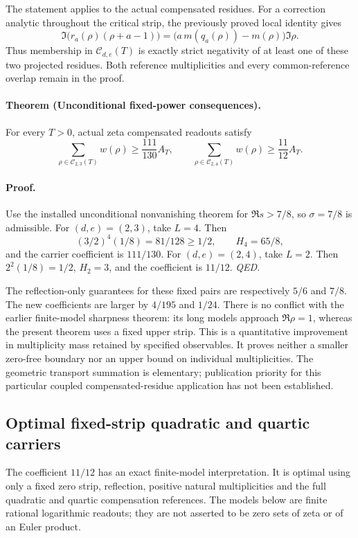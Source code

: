 The statement applies to the actual compensated residues. For a
correction analytic throughout the critical strip, the previously proved
local identity gives
\[
 \Im\!\bigl(r_a(\rho)(\rho+a-1)\bigr)
   =\bigl(a\,m(q_a(\rho))-m(\rho)\bigr)\Im\rho.
\]
Thus membership in \(\mathcal C_{d,e}(T)\) is exactly strict negativity
of at least one of these two projected residues. Both reference
multiplicities and every common-reference overlap remain in the proof.

\paragraph{Theorem (Unconditional fixed-power consequences).}
\label{thm:strip-carrier-seven-eighths}
For every \(T>0\), actual zeta compensated readouts satisfy
\[
 \sum_{\rho\in\mathcal C_{2,3}(T)}w(\rho)\ge\frac{111}{130}A_T,
 \qquad
 \sum_{\rho\in\mathcal C_{2,4}(T)}w(\rho)\ge\frac{11}{12}A_T.
\]
\paragraph{Proof.}
Use the installed unconditional nonvanishing theorem for
\(\Re s>7/8\), so \(\sigma=7/8\) is admissible.
For \((d,e)=(2,3)\), take \(L=4\). Then
\[
 (3/2)^4(1/8)=81/128\ge1/2,\qquad H_4=65/8,
\]
and the carrier coefficient is \(111/130\).
For \((d,e)=(2,4)\), take \(L=2\). Then
\(2^2(1/8)=1/2\), \(H_2=3\), and the coefficient is \(11/12\).
\hfill\textit{QED.}

The reflection-only guarantees for these fixed pairs are respectively
\(5/6\) and \(7/8\). The new coefficients are larger by \(4/195\)
and \(1/24\). There is no conflict with the earlier finite-model
sharpness theorem: its long models approach \(\Re\rho=1\), whereas
the present theorem uses a fixed upper strip. This is a quantitative
improvement in multiplicity mass retained by specified observables.
It proves neither a smaller zero-free boundary nor an upper bound on
individual multiplicities. The geometric transport summation is
elementary; publication priority for this particular coupled
compensated-residue application has not been established.

\subsection{Optimal fixed-strip quadratic and quartic carriers}
\label{sec:dyadic-fixed-strip-sharpness}

The coefficient \(11/12\) has an exact finite-model interpretation.
It is optimal using only a fixed zero strip, reflection, positive natural
multiplicities and the full quadratic and quartic compensation references.
The models below are finite rational logarithmic readouts; they are not
asserted to be zero sets of zeta or of an Euler product.

